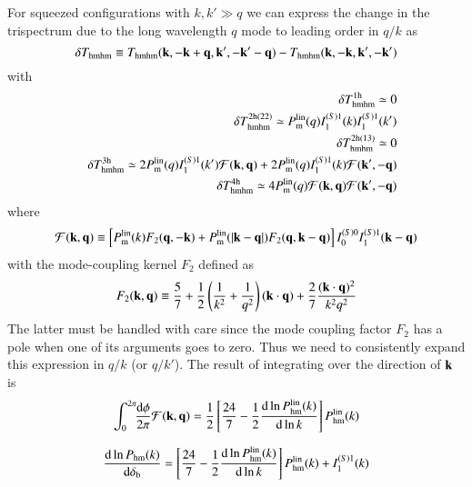 \documentclass[onecolumn,notitlepage,showpacs,amsmath,amssymb,prd,floatfix]{revtex4-1}
\newcommand{\bk}{{\bf k}}
\newcommand{\bq}{{\bf q}}
\newcommand{\dr}{\mathrm{d}}
\newcommand{\deltab}{\delta_{\rm b}}
\newcommand{\phml}{P_{\mathrm{hm}}^{\rm lin}}
\newcommand{\pml}{P^{\rm lin}_{\rm m}}
\begin{document}
For squeezed configurations with $k,k'\gg q$ we can express the change
in the trispectrum due to the long wavelength $q$ mode to leading order
in $q/k$ as
%
\begin{equation}
\delta T_{\rm hmhm}\equiv T_{\rm
 hmhm}(\bk,-\bk+\bq,\bk',-\bk'-\bq)-T_{\rm hmhm}(\bk,-\bk,\bk',-\bk')
\end{equation}
%
with
%
\begin{eqnarray}
 &&\delta T^{\rm 1h}_{\rm hmhm}\simeq 0\nonumber\\
 &&\delta T^{\rm 2h(22)}_{\rm hmhm}\simeq
  \pml(q)I^{(S)1}_1(k)I^{(S)1}_1(k')\nonumber\\
 &&\delta T^{\rm 2h(13)}_{\rm hmhm}\simeq 0\nonumber\\
 &&\delta T^{\rm 3h}_{\rm hmhm}\simeq 2\pml(q)I_1^{(S)1}(k'){\cal
  F}(\bk,\bq)+2\pml(q)I_1^{(S)1}(k){\cal F}(\bk',-\bq)\nonumber\\
 &&\delta T^{\rm 4h}_{\rm hmhm}\simeq 4\pml(q){\cal F}(\bk,\bq){\cal F}(\bk',-\bq)
\end{eqnarray}
%
where
%
\begin{eqnarray}
 {\cal F}(\bk,\bq)\equiv\left[
\pml(k)F_2(\bq,-\bk)+\pml(|\bk-\bq|)F_2(\bq,\bk-\bq)
			\right]I^{(S)0}_0I_1^{(S)1}(\bk-\bq)
\end{eqnarray}
%
with the mode-coupling kernel $F_2$ defined as
%
\begin{equation}
 F_2(\bk,\bq)\equiv \frac{5}{7}+\frac{1}{2}\left(\frac{1}{k^2}+\frac{1}{q^2}\right)(\bk\cdot\bq)
+\frac{2}{7}\frac{(\bk\cdot\bq)^2}{k^2q^2}
\end{equation}
%
The latter must be handled with care since the mode coupling factor
$F_2$ has a pole when one of its arguments goes to zero. Thus we need to
consistently expand this expression in $q/k$ (or $q/k'$).  The result of
integrating over the direction of $\bk$ is
%
\begin{equation}
 \int^{2\pi}_0\!\!\frac{\dr\phi}{2\pi}{\cal F}(\bk,\bq)=\frac{1}{2}
\left[\frac{24}{7}-\frac{1}{2}\frac{\dr\ln \phml(k)}{\dr \ln
 k}\right]\phml(k)
\end{equation}

\begin{equation}
 \frac{\dr \ln P_{\rm hm}(k)}{\dr \deltab}=
  \left[\frac{24}{7}-\frac{1}{2}\frac{\dr\ln \phml(k)}{\dr \ln
 k}\right]\phml(k)+I^{(S)1}_1(k)
\end{equation}
\end{document}
